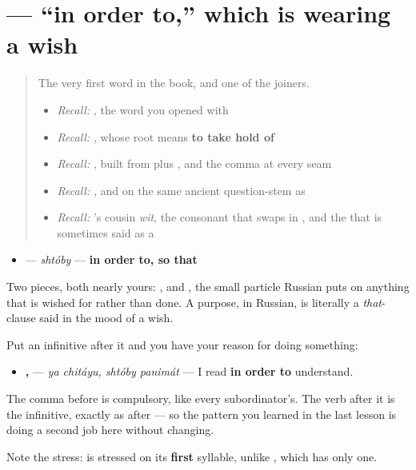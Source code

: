 \section[\texorpdfstring{\ru{чтобы} (shtóby)}{чтобы (shtóby)}]{ — \textquotedblleft{}in order to,\textquotedblright{} which is  wearing a wish}

\label{lesson:RU-C20-chtoby}



\begin{quote}
The very first word in the book, and one of the joiners.

\begin{itemize}
\raggedright
  \item \emph{Recall:} \emph{}, the word you opened with
  \item \emph{Recall:} \emph{}, whose root means \textbf{to take hold of}
  \item \emph{Recall:} \emph{}, built from \textbf{} plus \textbf{}, and the comma at every seam
  \item \emph{Recall:} \emph{}, and \emph{} on the same ancient question-stem as \emph{}
  \item \emph{Recall:} \emph{}'s cousin \emph{wit}, the consonant that swaps in \emph{ }, and the \textbf{} that is sometimes said as a \textbf{}
\end{itemize}
\end{quote}

\begin{grammarlens}[title={Grammar lens — a purpose is a wish with \ru{что} on the front}]
\begin{itemize}
\raggedright
  \item \textbf{} — \emph{shtóby} — \textbf{in order to, so that}
\end{itemize}

Two pieces, both nearly yours: \textbf{}, and \textbf{}, the small particle Russian puts on anything that is wished for rather than done. A purpose, in Russian, is literally a \emph{that}-clause said in the mood of a wish.

Put an infinitive after it and you have your reason for doing something:

\begin{itemize}
\raggedright
  \item \textbf{ ,  } — \emph{ya chitáyu, shtóby panimát} — I read \textbf{in order to} understand.
\end{itemize}

The comma before \textbf{} is compulsory, like every subordinator's. The verb after it is the infinitive, exactly as after \textbf{} — so the pattern you learned in the last lesson is doing a second job here without changing.

Note the stress: \textbf{} is stressed on its \textbf{first} syllable, unlike \textbf{}, which has only one.
\end{grammarlens}

